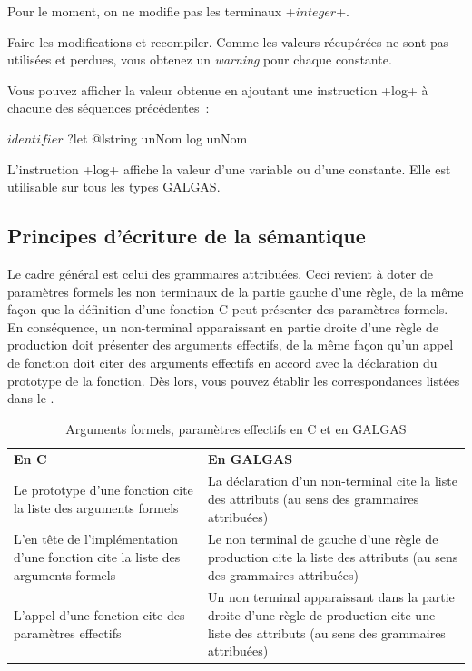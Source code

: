 Pour le moment, on ne modifie pas les terminaux \ggst+$integer$+.

Faire les modifications et recompiler. Comme les valeurs récupérées ne sont pas utilisées et perdues, vous obtenez un \emph{warning} pour chaque constante.

Vous pouvez afficher la valeur obtenue en ajoutant une instruction \ggst+log+ à chacune des séquences précédentes~:
\begin{galgas3}
$identifier$ ?let @lstring unNom
log unNom
\end{galgas3}

L'instruction \ggst+log+ affiche la valeur d'une variable ou d’une constante. Elle est utilisable sur tous les types GALGAS.

\subsection{Principes d'écriture de la sémantique}

Le cadre général est celui des grammaires attribuées. Ceci revient à doter de paramètres formels les non terminaux de la partie gauche d'une règle, de la même façon que la définition d'une fonction C peut présenter des paramètres formels. En conséquence, un non-terminal apparaissant en partie droite d'une règle de production doit présenter des arguments effectifs, de la même façon qu'un appel de fonction doit citer des arguments effectifs en accord avec la déclaration du prototype de la fonction. Dès lors, vous pouvez établir les correspondances listées dans le .

\begin{table}[t]
  \centering
  \begin{tabular}{p{8cm}p{6.7cm}}
    \textbf{En C} & \textbf{En GALGAS} \\
     Le prototype d'une fonction cite la liste des arguments formels & La déclaration d'un non-terminal cite la liste des attributs (au sens des grammaires attribuées) \\
     L'en tête de l'implémentation d'une fonction cite la liste des arguments formels & Le non terminal de gauche d'une règle de production cite la liste des attributs (au sens des grammaires attribuées) \\
     L'appel d'une fonction cite des paramètres effectifs & Un non terminal apparaissant dans la partie droite d'une règle de production cite une liste des attributs (au sens des grammaires attribuées) \\
  \end{tabular}
  \caption{Arguments formels, paramètres effectifs en C et en GALGAS}
\end{table}

